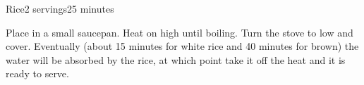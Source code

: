 \documentclass[../Cookbook.tex]{subfiles}
\begin{document}
\begin{recipe}[Rice]{Rice}{2 servings}{25 minutes}

Place in a small saucepan. Heat on high until boiling. Turn the stove to low and cover. Eventually (about 15 minutes for white rice and 40 minutes for brown) the water will be absorbed by the rice, at which point take it off the heat and it is ready to serve.

\end{recipe}
\end{document}
